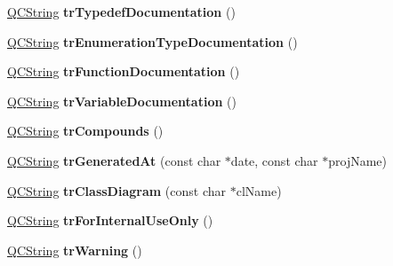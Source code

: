 \begin{DoxyCompactItemize}
\item 
\hypertarget{class_translator_slovene_a1611eb91129bc7fbac2586a1b913710d}{\hyperlink{class_q_c_string}{Q\-C\-String} {\bfseries tr\-Typedef\-Documentation} ()}\label{class_translator_slovene_a1611eb91129bc7fbac2586a1b913710d}

\item 
\hypertarget{class_translator_slovene_ae11f24a699bb6c1becaf521cdac12ab0}{\hyperlink{class_q_c_string}{Q\-C\-String} {\bfseries tr\-Enumeration\-Type\-Documentation} ()}\label{class_translator_slovene_ae11f24a699bb6c1becaf521cdac12ab0}

\item 
\hypertarget{class_translator_slovene_a54c0fb7e39b052558da3844673b26e1e}{\hyperlink{class_q_c_string}{Q\-C\-String} {\bfseries tr\-Function\-Documentation} ()}\label{class_translator_slovene_a54c0fb7e39b052558da3844673b26e1e}

\item 
\hypertarget{class_translator_slovene_aeff3c7fbc21cb023b224c101b81210ed}{\hyperlink{class_q_c_string}{Q\-C\-String} {\bfseries tr\-Variable\-Documentation} ()}\label{class_translator_slovene_aeff3c7fbc21cb023b224c101b81210ed}

\item 
\hypertarget{class_translator_slovene_ae2c887f8a9fe5663d722b798b02628e8}{\hyperlink{class_q_c_string}{Q\-C\-String} {\bfseries tr\-Compounds} ()}\label{class_translator_slovene_ae2c887f8a9fe5663d722b798b02628e8}

\item 
\hypertarget{class_translator_slovene_a6675fccca4756f9c0d86797009a4ad7e}{\hyperlink{class_q_c_string}{Q\-C\-String} {\bfseries tr\-Generated\-At} (const char $\ast$date, const char $\ast$proj\-Name)}\label{class_translator_slovene_a6675fccca4756f9c0d86797009a4ad7e}

\item 
\hypertarget{class_translator_slovene_a5dc8187057a8e4f4ca85ad94ade9e82c}{\hyperlink{class_q_c_string}{Q\-C\-String} {\bfseries tr\-Class\-Diagram} (const char $\ast$cl\-Name)}\label{class_translator_slovene_a5dc8187057a8e4f4ca85ad94ade9e82c}

\item 
\hypertarget{class_translator_slovene_ac4cc9aa408e288c1e2b037ec3b23c4f7}{\hyperlink{class_q_c_string}{Q\-C\-String} {\bfseries tr\-For\-Internal\-Use\-Only} ()}\label{class_translator_slovene_ac4cc9aa408e288c1e2b037ec3b23c4f7}

\item 
\hypertarget{class_translator_slovene_aae1caf252b911312ae9c13e4f478cea3}{\hyperlink{class_q_c_string}{Q\-C\-String} {\bfseries tr\-Warning} ()}\label{class_translator_slovene_aae1caf252b911312ae9c13e4f478cea3}


\end{DoxyCompactItemize}
